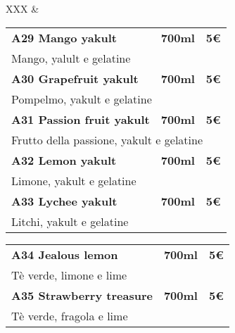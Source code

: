 \documentclass[hidelinks,10pt,a4paper]{article}
\newcommand{\mybox}[1]{
		\colorbox{square}{
		\begin{minipage}{0.97\linewidth}
			#1
		\end{minipage}
	}
}
\newcommand{\entryThreeDesc}[4]{
{\vspace*{-0.5mm}\textbf{\small{#1}}}&{\vspace*{-0.5mm}\textbf{\small{#3}}}&{\vspace*{-0.5mm}\textbf{\small{#4}}}\\
 \multicolumn{3}{l}{\textcolor{desc}{\footnotesize{#2}}} \\
}
\begin{document}
\begin{landscape}
\begin{tabularx}{\linewidth}{XXX}
{		}&{
		
			\vspace*{0.1cm}
			\mybox{
			\begin{tabular*}{\linewidth}{ l l l }
				\entryThreeDesc{A29 Mango yakult}{Mango, yalult e gelatine}{\hspace*{8mm}700ml}{\hspace*{10mm}5€}
				\entryThreeDesc{A30 Grapefruit yakult}{Pompelmo, yakult e gelatine}{\hspace*{8mm}700ml}{\hspace*{10mm}5€}
				\entryThreeDesc{A31 Passion fruit yakult}{Frutto della passione, yakult e gelatine}{\hspace*{8mm}700ml}{\hspace*{10mm}5€}
				\entryThreeDesc{A32 Lemon yakult}{Limone, yakult e gelatine}{\hspace*{8mm}700ml}{\hspace*{10mm}5€}
				\entryThreeDesc{A33 Lychee yakult}{Litchi, yakult e gelatine}{\hspace*{8mm}700ml}{\hspace*{10mm}5€}
			\end{tabular*}
			}
			
			\mybox{
				\begin{tabular*}{\linewidth}{ l l l }
					\entryThreeDesc{A34 Jealous lemon}{Tè verde, limone e lime}{\hspace*{7mm}700ml}{\hspace*{10mm}5€}
					\entryThreeDesc{A35 Strawberry treasure}{Tè verde, fragola e lime}{\hspace*{7mm}700ml}{\hspace*{10mm}5€}
				\end{tabular*}
			}
			
}
\end{tabularx}
\end{landscape}
\end{document}
